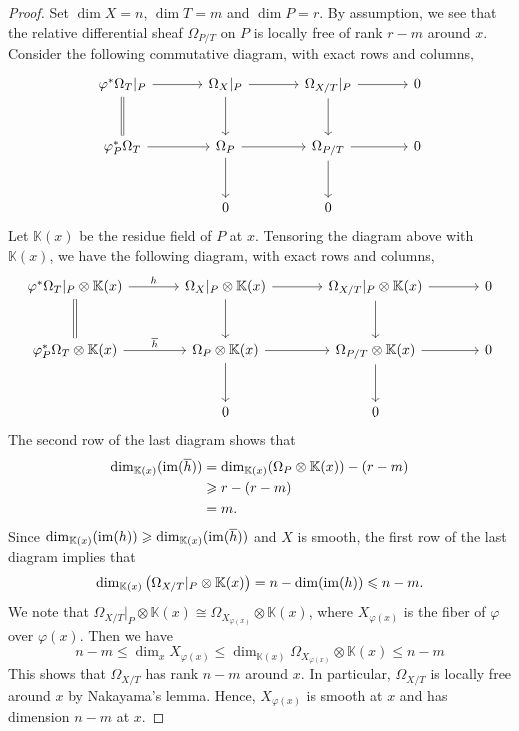 \documentclass[english,reqno]{amsart}
\newcommand\bbK{{\mathbb K}}
\newcommand{\im}{{\rm im}}
\theoremstyle{plain}
\theoremstyle{definition}
\numberwithin{equation}{section} %
\begin{document}
\begin{proof}
	Set $\dim X = n$, $\dim T=m$ and $\dim P = r$.  By assumption, we see that the relative differential sheaf $\Omega_{P/T}$ on $P$ is locally free of rank $r-m$ around $x$. Consider the following commutative diagram, with exact rows and columns,
	\[
	\begin{tikzcd}[column sep=large, row sep=large]
	\varphi^*\Omega_T\vert_{P}\rar \ar[d,equal]  &  \Omega_X\vert_{P}\dar\rar  &  \Omega_{X/T}\vert_{P}\rar\dar   & 0 \\
	\varphi_P^*\Omega_T\rar& \Omega_{P}\rar\dar    &  \Omega_{P/T}\ar[r]\ar[d]   & 0\\
	& 0 & 0 &
	\end{tikzcd}
	\]
	Let $\bbK(x)$ be the residue field of $P$ at $x$. Tensoring the diagram above with $\bbK(x)$, we have the following diagram, with exact rows and columns,
	\[
	\begin{tikzcd}[column sep=large, row sep=large]
	\varphi^*\Omega_T\vert_{P}\otimes\bbK(x)\rar{h}\ar[d,equal]  &  \Omega_X\vert_{P}\otimes\bbK(x)\dar\rar &  \Omega_{X/T}\vert_{P}\otimes\bbK(x)\rar \dar  & 0 \\
	\varphi_P^*\Omega_T\otimes\bbK(x)\rar{\overline{h}}& \Omega_{P}\otimes\bbK(x)\rar\dar     &  \Omega_{P/T}\otimes\bbK(x)\rar \dar  & 0\\
	& 0 & 0 &
	\end{tikzcd}
	\]
	The second row of the last diagram shows that
	\begin{align*}
	\dim_{\bbK(x)}(\im(\overline{h})) & = \dim_{\bbK(x)}(\Omega_P\otimes\bbK(x))-\left(r-m\right)\\
	& \geqslant r-\left(r-m\right)\\
	& = m.
	\end{align*}
	Since $\dim_{\bbK(x)}(\im(h))\geqslant \dim_{\bbK(x)}(\im(\overline{h}))$ and $X$ is smooth, the first row of the last diagram   implies that
	\begin{equation*}
	\label{equation:dimension-fibers-cotangents}
	\dim_{\bbK(x)}\left(\Omega_{X/T}\vert_{P}\otimes\bbK(x)\right)= n-\dim(\im(h))\leqslant n-m.
	\end{equation*}
	We note that $\Omega_{X/T}\vert_{P}\otimes\bbK(x) \cong \Omega_{X_{\varphi(x)}}\otimes\bbK(x)$, where $X_{\varphi(x)}$ is the fiber of $\varphi$ over $\varphi(x)$. Then we have
	\[
	n-m\leqslant \dim_x X_{\varphi(x)}  \leqslant \dim_{\bbK(x)} \Omega_{X_{\varphi(x)}}\otimes\bbK(x) \leqslant n-m
	\]
	This shows that $\Omega_{X/T}$ has rank $n-m$ around $x$. In particular, $\Omega_{X/T}$ is locally free around $x$ by Nakayama's lemma. Hence, $X_{\varphi(x)}$ is smooth at $x$ and has dimension $n-m$ at $x$.
\end{proof}
\end{document}
